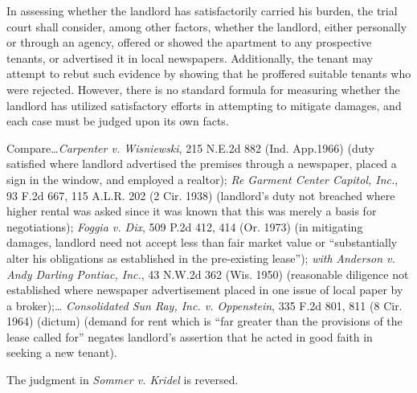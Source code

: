 In assessing whether the landlord has satisfactorily carried his burden, the
trial court shall consider, among other factors, whether the landlord, either
personally or  through an agency, offered or showed the apartment to any
prospective tenants, or advertised it in local newspapers. Additionally, the
tenant may attempt to rebut such evidence by showing that he proffered suitable
tenants who were rejected. However, there is no standard formula for measuring
whether the landlord has utilized satisfactory efforts in attempting to
mitigate damages, and each case must be judged upon its own facts.

Compare\ldots \textit{Carpenter v. Wisniewski}, 215 N.E.2d 882 (Ind. App.1966)
(duty satisfied where landlord advertised the premises through a newspaper,
placed a sign in the window, and employed a realtor); \textit{Re Garment Center
Capitol, Inc.}, 93 F.2d 667, 115 A.L.R. 202 (2 Cir. 1938) (landlord's duty not
breached where higher rental was asked since it was known that this was merely
a basis for negotiations); \textit{Foggia v. Dix}, 509 P.2d 412, 414 (Or. 1973)
(in mitigating damages, landlord need not accept less than fair market value or
``substantially alter his obligations as established in the pre-existing
lease''); \textit{with} \textit{Anderson v. Andy Darling Pontiac, Inc.}, 43
N.W.2d 362 (Wis. 1950) (reasonable diligence not established where newspaper
advertisement placed in one issue of local paper by a broker);\ldots
\textit{Consolidated Sun Ray, Inc. v. Oppenstein}, 335 F.2d 801, 811 (8 Cir.
1964) (dictum) (demand for rent which is ``far greater than the provisions of
the lease called for'' negates landlord's assertion that he acted in good faith
in seeking a new tenant).


The judgment in \textit{Sommer v. Kridel} is reversed.


